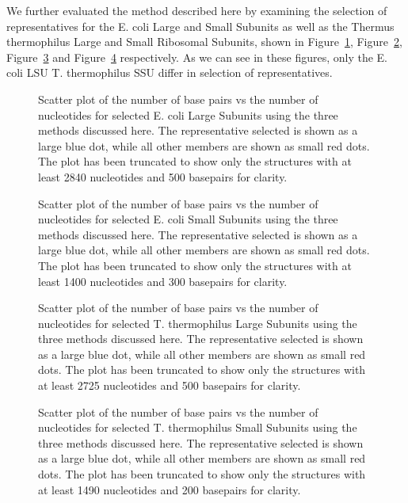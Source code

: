 We further evaluated the method described here by examining the selection of
representatives for the E. coli Large and Small Subunits as well as the Thermus
thermophilus Large and Small Ribosomal Subunits, shown in
Figure~\ref{fig:ec-lsu-rep}, Figure~\ref{fig:ec-ssu-rep},
Figure~\ref{fig:tt-lsu-rep} and Figure~\ref{fig:tt-ssu-rep} respectively. As we
can see in these figures, only the E. coli LSU T. thermophilus SSU differ in
selection of representatives. 

\begin{figure}
  \caption{Scatter plot of the number of base pairs vs the number of nucleotides
    for selected E. coli Large Subunits using the three methods discussed here.
    The representative selected is shown as a large blue dot, while all other
    members are shown as small red dots. The plot has been truncated to show
    only the structures with at least 2840 nucleotides and 500 basepairs for
  clarity.}
  \label{fig:ec-lsu-rep}
\end{figure}

\begin{figure}
  \caption{Scatter plot of the number of base pairs vs the number of nucleotides
    for selected E. coli Small Subunits using the three methods discussed here.
    The representative selected is shown as a large blue dot, while all other
    members are shown as small red dots. The plot has been truncated to show
    only the structures with at least 1400 nucleotides and 300 basepairs for
  clarity.}
  \label{fig:ec-ssu-rep}
\end{figure}

\begin{figure}
  \caption{Scatter plot of the number of base pairs vs the number of nucleotides
    for selected T. thermophilus Large Subunits using the three methods
    discussed here. The representative selected is shown as a large blue dot,
    while all other members are shown as small red dots. The plot has been
    truncated to show only the structures with at least 2725 nucleotides and 500
  basepairs for clarity.}
  \label{fig:tt-lsu-rep}
\end{figure}

\begin{figure}
  \caption{Scatter plot of the number of base pairs vs the number of nucleotides
    for selected T. thermophilus Small Subunits using the three methods
    discussed here. The representative selected is shown as a large blue dot,
    while all other members are shown as small red dots. The plot has been
    truncated to show only the structures with at least 1490 nucleotides and 200
  basepairs for clarity.}
  \label{fig:tt-ssu-rep}
\end{figure}

